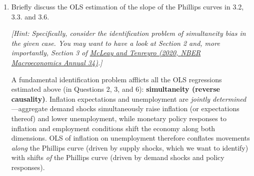 \documentclass[dvipsnames,11pt]{article}
\begin{document}
\begin{enumerate}[resume]
\begin{solution}
                    A final remark concerns timing. The dependent variable as specified in Panel~(a), $\pi_t - E_t^{MSC}[\pi_{t+4}]$, is not a properly aligned conditional surprise: $\pi_t$ is current year-on-year inflation while $E_t^{MSC}[\pi_{t+4}]$ is a forecast for a horizon four quarters out, so the realisation and the forecast horizon do not match. Panel~(b) substitutes $E_{t-4}^{MSC}[\pi_t]$---the median forecast made one year earlier of the YoY inflation rate that has just realised---which aligns the forecast horizon with the outcome it predicts. The slope flips from a small positive value to a visibly negative one ($\hat{\kappa}=-0.132$, HC1 SE $=0.059$; $R^2=0.032$, $N=188$). This sensitivity is itself a useful diagnostic: a non-trivial part of the apparent ``flattening'' in Panel~(a) is mechanical mis-alignment between the realisation and the forecast, not evidence on the structural Phillips slope. Identifying that slope requires more than swapping out the expectations measure---an issue we develop in Question~7.

                \end{solution}
        
             \item Briefly discuss the OLS estimation of the slope of the Phillips curves in 3.2, 3.3. and 3.6. 
        
                \textit{[Hint: Specifically, consider the identification problem of simultaneity bias in the given case. You may want to have a look at Section 2 and, more importantly, Section 3 of \href{https://www.journals.uchicago.edu/doi/full/10.1086/707181}{McLeay and Tenreyro (2020, \emph{NBER Macroeconomics Annual} 34)}.]}
        
                \begin{solution}
        
                    A fundamental identification problem afflicts all the OLS regressions estimated above (in Questions 2, 3, and 6): \textbf{simultaneity (reverse causality)}. Inflation expectations and unemployment are \emph{jointly determined}---aggregate demand shocks simultaneously raise inflation (or expectations thereof) and lower unemployment, while monetary policy responses to inflation and employment conditions shift the economy along both dimensions. OLS of inflation on unemployment therefore conflates movements \emph{along} the Phillips curve (driven by supply shocks, which we want to identify) with shifts \emph{of} the Phillips curve (driven by demand shocks and policy responses).
                    

\end{solution}
\end{enumerate}
\end{document}
